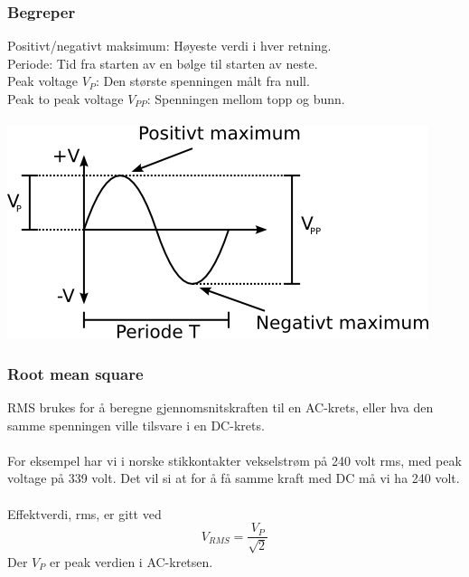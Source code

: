 \subsubsection{Begreper}
Positivt/negativt maksimum: Høyeste verdi i hver retning. \\
Periode: Tid fra starten av en bølge til starten av neste. \\
Peak voltage $V_P$: Den største spenningen målt fra null. \\
Peak to peak voltage $V_{PP}$: Spenningen mellom topp og bunn. \\
\\
\includegraphics[width=\textwidth]{./img/veksel}

\subsubsection{Root mean square}
RMS brukes for å beregne gjennomsnitskraften til en AC-krets,
eller hva den samme spenningen ville tilsvare i en DC-krets.
\\\\
For eksempel har vi i norske stikkontakter vekselstrøm på 240 volt rms,
med peak voltage på 339 volt.
Det vil si at for å få samme kraft med DC må vi ha 240 volt.
\\\\
Effektverdi, rms, er gitt ved
$$V_{RMS} = \frac{V_P}{\sqrt{2}}$$
Der $V_P$ er peak verdien i AC-kretsen.
